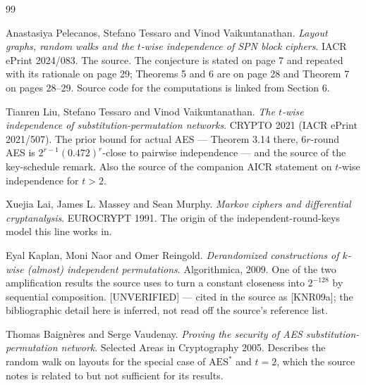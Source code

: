 \documentclass{aicr-conjecture}
\begin{document}
\begin{aicrbibliography}{99}

Anastasiya Pelecanos, Stefano Tessaro and Vinod Vaikuntanathan.
\emph{Layout graphs, random walks and the $t$-wise independence of SPN
block ciphers}.
IACR ePrint 2024/083.
The source. The conjecture is stated on page 7 and repeated with its
rationale on page 29; Theorems 5 and 6 are on page 28 and Theorem 7 on
pages 28--29. Source code for the computations is linked from Section 6.

Tianren Liu, Stefano Tessaro and Vinod Vaikuntanathan.
\emph{The $t$-wise independence of substitution-permutation networks}.
CRYPTO 2021 (IACR ePrint 2021/507).
The prior bound for actual AES --- Theorem 3.14 there, $6r$-round AES is
$2^{r-1}(0.472)^{r}$-close to pairwise independence --- and the source of
the key-schedule remark. Also the source of the companion AICR
statement on $t$-wise independence for $t > 2$.

Xuejia Lai, James L. Massey and Sean Murphy.
\emph{Markov ciphers and differential cryptanalysis}.
EUROCRYPT 1991.
The origin of the independent-round-keys model this line works in.

Eyal Kaplan, Moni Naor and Omer Reingold.
\emph{Derandomized constructions of $k$-wise (almost) independent
permutations}.
Algorithmica, 2009.
One of the two amplification results the source uses to turn a constant
closeness into $2^{-128}$ by sequential composition. [UNVERIFIED] ---
cited in the source as [KNR09a]; the bibliographic detail here is
inferred, not read off the source's reference list.

Thomas Baign\`eres and Serge Vaudenay.
\emph{Proving the security of AES substitution-permutation network}.
Selected Areas in Cryptography 2005.
Describes the random walk on layouts for the special case of
$\mathrm{AES}^{\ast}$ and $t = 2$, which the source notes is related to
but not sufficient for its results.

\end{aicrbibliography}
\end{document}
